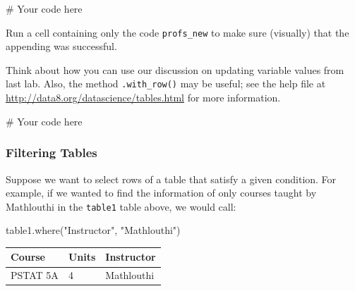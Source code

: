 \documentclass[
  11pt,
]{article}
\newenvironment{Shaded}{\begin{snugshade}}{\end{snugshade}}
\newcommand{\CommentTok}[1]{\textcolor[rgb]{0.37,0.37,0.37}{#1}}
\newcommand{\NormalTok}[1]{\textcolor[rgb]{0.00,0.23,0.31}{#1}}
\newcommand{\StringTok}[1]{\textcolor[rgb]{0.13,0.47,0.30}{#1}}
\begin{document}
\begin{Shaded}
\begin{Highlighting}[]
\CommentTok{\# Your code here}
\end{Highlighting}
\end{Shaded}

Run a cell containing only the code \texttt{profs\_new} to make sure
(visually) that the appending was successful.

\begin{tcolorbox}[enhanced jigsaw, bottomrule=.15mm, colframe=quarto-callout-tip-color-frame, coltitle=black, left=2mm, title=\textcolor{quarto-callout-tip-color}{\faLightbulb}\hspace{0.5em}{Tip}, opacityback=0, opacitybacktitle=0.6, leftrule=.75mm, breakable, bottomtitle=1mm, toprule=.15mm, rightrule=.15mm, arc=.35mm, titlerule=0mm, colback=white, toptitle=1mm, colbacktitle=quarto-callout-tip-color!10!white]

Think about how you can use our discussion on updating variable values
from last lab. Also, the method \texttt{.with\_row()} may be useful; see
the help file at \url{http://data8.org/datascience/tables.html} for more
information.

\end{tcolorbox}

\begin{Shaded}
\begin{Highlighting}[]
\CommentTok{\# Your code here}
\end{Highlighting}
\end{Shaded}

\subsubsection{Filtering Tables}\label{filtering-tables}

Suppose we want to select rows of a table that satisfy a given
condition. For example, if we wanted to find the information of only
courses taught by Mathlouthi in the \texttt{table1} table above, we
would call:

\begin{Shaded}
\begin{Highlighting}[]
\NormalTok{table1.where(}\StringTok{"Instructor"}\NormalTok{, }\StringTok{"Mathlouthi"}\NormalTok{)}
\end{Highlighting}
\end{Shaded}

\begin{longtable}[]{@{}lll@{}}
\toprule\noalign{}
Course & Units & Instructor \\
\midrule\noalign{}
\endhead
\bottomrule\noalign{}
\endlastfoot
PSTAT 5A & 4 & Mathlouthi \\
\end{longtable}
\end{document}
